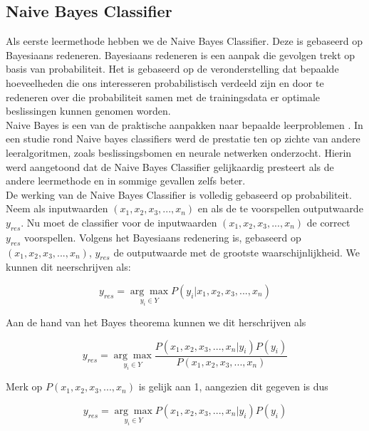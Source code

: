 \subsection{Naive Bayes Classifier}\label{Naive Bayes Classifier}

Als eerste leermethode hebben we de Naive Bayes Classifier. Deze is gebaseerd op Bayesiaans redeneren. Bayesiaans redeneren is een aanpak die gevolgen trekt op basis van probabiliteit. Het is gebaseerd op de veronderstelling dat bepaalde hoeveelheden die ons interesseren probabilistisch verdeeld zijn en door te redeneren over die probabiliteit samen met de trainingsdata er optimale beslissingen kunnen genomen worden.\\%
Naive Bayes is een van de praktische aanpakken naar bepaalde leerproblemen \cite{mitchell1997machine}. In een studie \cite{Michie94machinelearning} rond Naive bayes classifiers werd de  prestatie ten op zichte van andere leeralgoritmen, zoals beslissingsbomen en neurale netwerken onderzocht. Hierin werd aangetoond dat de Naive Bayes Classifier gelijkaardig presteert als de andere leermethode en in sommige gevallen zelfs beter.\\
%
De werking van de Naive Bayes Classifier is volledig gebaseerd op probabiliteit. Neem als inputwaarden $(x_{1} , x_{2}, x_{3}, ..., x_{n})$ en als de te voorspellen outputwaarde $y_{res}$. Nu moet de classifier voor de inputwaarden $(x_{1} , x_{2}, x_{3}, ..., x_{n})$ de correct $y_{res}$ voorspellen. Volgens het Bayesiaans redenering is, gebaseerd op $(x_{1} , x_{2}, x_{3}, ..., x_{n})$,  $y_{res}$ de outputwaarde met de grootste waarschijnlijkheid. We kunnen dit neerschrijven als:

\[y_{res} = \underset{y_i \in Y}{\arg\max}P(y_i|x_{1},x_{2},x_{3},...,x_{n}) \] 

Aan de hand van het Bayes theorema kunnen we dit herschrijven als

\[ y_{res} = \underset{y_i \in Y}{\arg\max}\frac{P(x_{1},x_{2},x_{3},...,x_{n}|y_i)P(y_i)}{P(x_{1},x_{2}, x_{3},...,x_{n})} \]

 Merk op $P(x_{1},x_{2},x_{3},...,x_{n})$ is gelijk aan 1, aangezien dit gegeven is dus

 \[ y_{res} = \underset{y_i \in Y}{\arg\max}P(x_{1},x_{2},x_{3},...,x_{n}|y_i)P(y_i) \]


